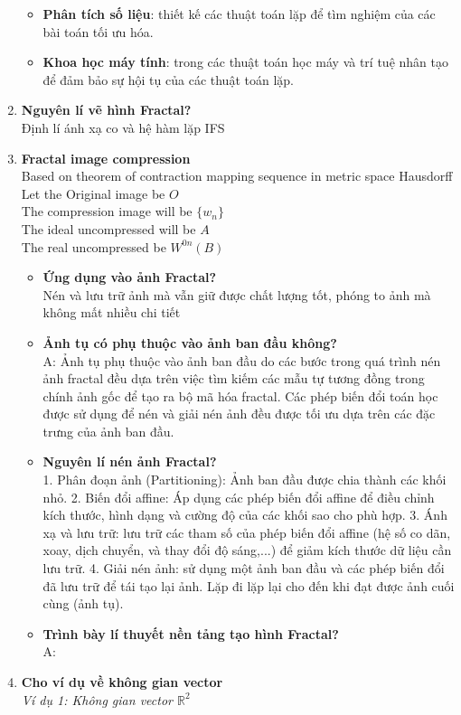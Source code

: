\begin{enumerate}
    \begin{itemize}
        \item \textbf{Phân tích số liệu}: thiết kế các thuật toán lặp để tìm nghiệm của các bài toán tối ưu hóa.
        \item \textbf{Khoa học máy tính}: trong các thuật toán học máy và trí tuệ nhân tạo để đảm bảo sự hội tụ của các thuật toán lặp.
    \end{itemize}
    \item \textbf{Nguyên lí vẽ hình Fractal?}\\
    Định lí ánh xạ co và hệ hàm lặp IFS 
    \item \textbf{Fractal image compression}\\   
    Based on theorem of contraction mapping sequence in metric space Hausdorff\\
    Let the Original image be $O$\\
    The compression image will be $\{ w_n \}$\\
    The ideal uncompressed will be $A$\\
    The real uncompressed be $W^{0n}(B)$
    \begin{itemize}
        \item \textbf{Ứng dụng vào ảnh Fractal?}\\
        Nén và lưu trữ ảnh mà vẫn giữ được chất lượng tốt, phóng to ảnh mà không mất nhiều chi tiết
        \item \textbf{Ảnh tụ có phụ thuộc vào ảnh ban đầu không?}\\
        A: Ảnh tụ phụ thuộc vào ảnh ban đầu do các bước trong quá trình nén ảnh fractal đều dựa trên việc tìm kiếm các mẫu tự tương đồng trong chính ảnh gốc để tạo ra bộ mã hóa fractal. Các phép biến đổi toán học được sử dụng để nén và giải nén ảnh đều được tối ưu dựa trên các đặc trưng của ảnh ban đầu.
        \item \textbf{Nguyên lí nén ảnh Fractal?}\\
        1. Phân đoạn ảnh (Partitioning): Ảnh ban đầu được chia thành các khối nhỏ.
        2. Biến đổi affine: Áp dụng các phép biến đổi affine để điều chỉnh kích thước, hình dạng và cường độ của các khối sao cho phù hợp.        
        3. Ánh xạ và lưu trữ: lưu trữ các tham số của phép biến đổi affine (hệ số co dãn, xoay, dịch chuyển, và thay đổi độ sáng,...) để giảm kích thước dữ liệu cần lưu trữ.
        4. Giải nén ảnh: sử dụng một ảnh ban đầu và các phép biến đổi đã lưu trữ để tái tạo lại ảnh. Lặp đi lặp lại cho đến khi đạt được ảnh cuối cùng (ảnh tụ).
        \item \textbf{Trình bày lí thuyết nền tảng tạo hình Fractal?}\\
        A: 
    \end{itemize}
    \item \textbf{Cho ví dụ về không gian vector}\\
    \textit{Ví dụ 1: Không gian vector $\mathbb{R}^2$}
    

\end{enumerate}
